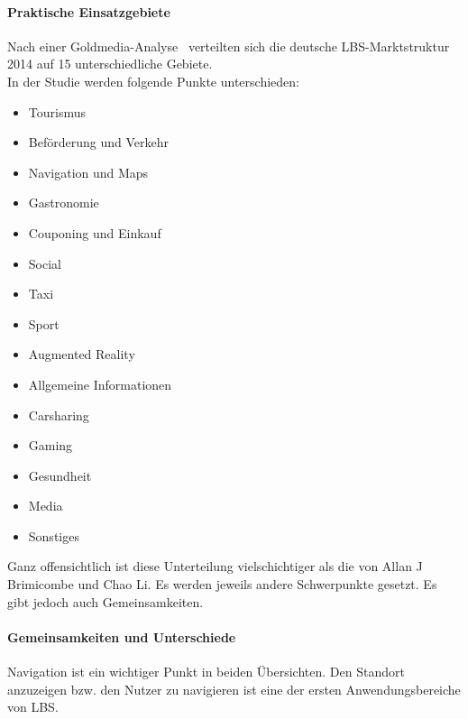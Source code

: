 \paragraph{Praktische Einsatzgebiete}
Nach einer Goldmedia-Analyse~\cite[S.9]{goldmedia:lbs} verteilten sich die deutsche LBS-Marktstruktur 2014 auf 15 unterschiedliche Gebiete.\\
In der Studie werden folgende Punkte unterschieden:
\begin{itemize}
	\item Tourismus
	\item Beförderung und Verkehr
	\item Navigation und Maps
	\item Gastronomie
	\item Couponing und Einkauf
	\item Social
	\item Taxi
	\item Sport
	\item Augmented Reality
	\item Allgemeine Informationen
	\item Carsharing
	\item Gaming
	\item Gesundheit
	\item Media
	\item Sonstiges
\end{itemize}
Ganz offensichtlich ist diese Unterteilung vielschichtiger als die von Allan J Brimicombe und Chao Li. Es werden jeweils andere Schwerpunkte gesetzt. Es gibt jedoch auch Gemeinsamkeiten.

\paragraph{Gemeinsamkeiten und Unterschiede}
Navigation ist ein wichtiger Punkt in beiden Übersichten. Den Standort anzuzeigen bzw. den Nutzer zu navigieren ist eine der ersten Anwendungsbereiche von LBS.